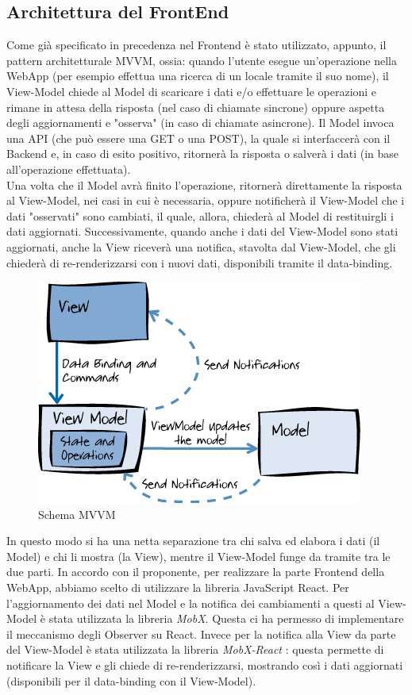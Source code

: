 \subsection{Architettura del FrontEnd}

Come già specificato in precedenza nel Frontend è stato utilizzato, appunto, il pattern architetturale MVVM, ossia: quando l’utente esegue un’operazione nella WebApp (per esempio effettua una ricerca di un locale tramite il suo nome), il View-Model chiede al Model di scaricare i dati e/o effettuare le operazioni e rimane in attesa della risposta (nel caso di chiamate sincrone) oppure aspetta degli aggiornamenti e "osserva" (in caso di chiamate asincrone). Il Model invoca una API (che può essere una GET o una POST), la quale si interfaccerà con il Backend e, in caso di esito positivo, ritornerà la risposta o salverà i dati (in base all'operazione effettuata). \\
Una volta che il Model avrà finito l'operazione, ritornerà direttamente la risposta al View-Model, nei casi in cui è necessaria, oppure notificherà il View-Model che i dati "osservati" sono cambiati, il quale, allora, chiederà al Model di restituirgli i dati aggiornati. Successivamente, quando anche i dati del View-Model sono stati aggiornati, anche la View riceverà una notifica, stavolta dal View-Model, che gli chiederà di re-renderizzarsi con i nuovi dati, disponibili tramite il data-binding. 



\begin{figure}[H]
    \centering
    \includegraphics[scale=0.5]{Contenuto/Immagini/MVVM.png}
    \caption{Schema MVVM}
\end{figure}

In questo modo si ha una netta separazione tra chi salva ed elabora i dati (il Model) e chi li mostra (la View), mentre il View-Model funge da tramite tra le due parti. 
In accordo con il proponente, per realizzare la parte Frontend della WebApp, abbiamo scelto di utilizzare la libreria JavaScript React. Per l'aggiornamento dei dati nel Model e la notifica dei cambiamenti a questi al View-Model è stata utilizzata la libreria \textit{MobX}. Questa ci ha permesso di implementare il meccanismo degli Observer su React. 
Invece per la notifica alla View da parte del View-Model è stata utilizzata la libreria \textit{MobX-React} : questa permette di notificare la View e gli chiede di re-renderizzarsi, mostrando così i dati aggiornati (disponibili per il data-binding con il View-Model).



